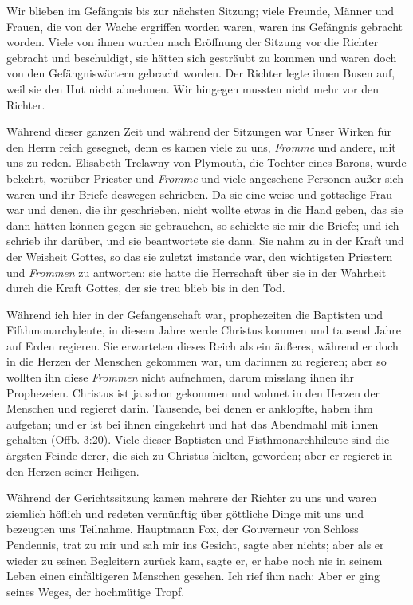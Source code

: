 Wir blieben im Gefängnis bis zur nächsten Sitzung; viele
Freunde, Männer und Frauen, die von der Wache ergriffen
worden waren, waren ins Gefängnis gebracht worden. Viele
von ihnen wurden nach Eröffnung der Sitzung vor die Richter
gebracht und beschuldigt, sie hätten sich gesträubt zu kommen
und waren doch von den Gefängniswärtern gebracht worden.
Der Richter legte ihnen Busen auf, weil sie den Hut nicht 
abnehmen. Wir hingegen mussten nicht mehr vor den Richter.


Während dieser ganzen Zeit und während der Sitzungen war
Unser Wirken für den Herrn reich gesegnet, denn es kamen viele
zu uns, \textit{Fromme} und andere, mit uns zu reden. Elisabeth
Trelawny von Plymouth, die 
Tochter eines Barons, wurde bekehrt,
worüber Priester und \textit{Fromme} und viele angesehene Personen
außer sich waren und ihr Briefe deswegen schrieben. Da sie eine
weise und gottselige Frau war und denen, die ihr geschrieben,
nicht wollte etwas in die Hand geben, das sie dann hätten können
gegen sie gebrauchen, so schickte sie mir die Briefe; und ich schrieb
ihr darüber, und sie beantwortete sie dann. Sie nahm zu in der
Kraft und der Weisheit Gottes, so das sie zuletzt imstande war,
den wichtigsten Priestern und \textit{Frommen} zu antworten; sie hatte
die Herrschaft über sie in der Wahrheit durch die Kraft Gottes,
der sie treu blieb bis in den Tod.


Während ich hier in der Gefangenschaft war, prophezeiten
die Baptisten und Fifthmonarchyleute, 
in diesem Jahre werde
Christus kommen und tausend Jahre auf Erden regieren. Sie
erwarteten dieses Reich als ein äußeres, während er doch in die
Herzen der Menschen gekommen war, um darinnen zu regieren;
aber so wollten ihn diese \textit{Frommen} nicht aufnehmen, darum
misslang ihnen ihr Prophezeien. Christus ist ja schon gekommen 
 und wohnet in 
den Herzen der Menschen und regieret
darin. Tausende, bei denen er anklopfte, haben ihm aufgetan;
und er ist bei ihnen eingekehrt und hat das 
Abendmahl mit ihnen
gehalten (Offb. 3:20). 
Viele dieser Baptisten und 
Fisthmonarchhileute sind 
die ärgsten Feinde derer, die sich zu Christus hielten,
geworden; aber er regieret in den Herzen seiner Heiligen.



Während der Gerichtssitzung kamen mehrere der Richter zu
uns und waren ziemlich höflich und redeten vernünftig über
göttliche Dinge mit uns und bezeugten uns Teilnahme. 
Hauptmann Fox, der Gouverneur 
von Schloss Pendennis, trat zu mir
und sah mir ins Gesicht, sagte aber nichts; aber als er wieder
zu seinen Begleitern zurück kam, sagte er, er habe noch nie in
seinem Leben einen einfältigeren Menschen gesehen. Ich rief ihm
nach:  Aber er
ging seines Weges, der hochmütige Tropf.


